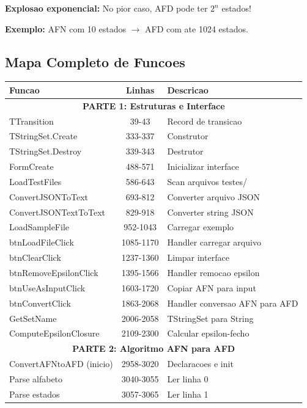 \documentclass[12pt,a4paper]{article}
\begin{document}
\textbf{Explosao exponencial:} No pior caso, AFD pode ter $2^n$ estados!

\textbf{Exemplo:} AFN com 10 estados $\rightarrow$ AFD com ate 1024 estados.

\subsection{Mapa Completo de Funcoes}

\begin{table}[h]
\centering
\small
\begin{tabular}{|l|c|p{6cm}|}
\hline
\textbf{Funcao} & \textbf{Linhas} & \textbf{Descricao} \\
\hline
\multicolumn{3}{|c|}{\textbf{PARTE 1: Estruturas e Interface}} \\
\hline
TTransition & 39-43 & Record de transicao \\
TStringSet.Create & 333-337 & Construtor \\
TStringSet.Destroy & 339-343 & Destrutor \\
FormCreate & 488-571 & Inicializar interface \\
LoadTestFiles & 586-643 & Scan arquivos testes/ \\
ConvertJSONToText & 693-812 & Converter arquivo JSON \\
ConvertJSONTextToText & 829-918 & Converter string JSON \\
LoadSampleFile & 952-1043 & Carregar exemplo \\
btnLoadFileClick & 1085-1170 & Handler carregar arquivo \\
btnClearClick & 1237-1360 & Limpar interface \\
btnRemoveEpsilonClick & 1395-1566 & Handler remocao epsilon \\
btnUseAsInputClick & 1603-1720 & Copiar AFN para input \\
btnConvertClick & 1863-2068 & Handler conversao AFN para AFD \\
GetSetName & 2006-2058 & TStringSet para String \\
ComputeEpsilonClosure & 2109-2300 & Calcular epsilon-fecho \\
\hline
\multicolumn{3}{|c|}{\textbf{PARTE 2: Algoritmo AFN para AFD}} \\
\hline
ConvertAFNtoAFD (inicio) & 2958-3020 & Declaracoes e init \\
Parse alfabeto & 3040-3055 & Ler linha 0 \\
Parse estados & 3057-3065 & Ler linha 1 \\

\end{tabular}
\end{table}
\end{document}
